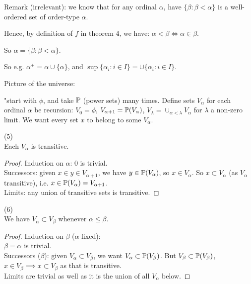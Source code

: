 \documentclass[a4paper]{article}
\begin{document}
Remark (irrelevant): we know that for any ordinal $\alpha$, have $\{\beta:\beta<\alpha\}$ is a well-ordered set of order-type $\alpha$.

Hence, by definition of $f$ in theorem 4, we have: $\alpha<\beta \iff \alpha \in \beta$.

So $\alpha = \{\beta:\beta<\alpha\}$.

So e.g. $\alpha^+ = \alpha \cup \{\alpha\}$, and $\sup\{\alpha_i:i \in I\} = \cup\{\alpha_i:i\in I\}$.

Picture of the universe:

"start with $\phi$, and take $\P$ (power sets) many times. Define sets $V_\alpha$ for each ordinal $\alpha$ be recursion: $V_0 = \phi$, $V_{\alpha+1} = \P(V_\alpha)$, $V_\lambda = \cup_{\alpha < \lambda} V_\alpha$ for $\lambda$ a non-zero limit. We want every set $x$ to belong to some $V_\alpha$.

\begin{lemma} (5)\\
Each $V_\alpha$ is transitive.
\begin{proof}
Induction on $\alpha$: 0 is trivial.\\
Successors: given $x \in y \in V_{\alpha+1}$, we have $y \in \P(V_\alpha)$, so $x \in V_\alpha$. So $x \subset V_\alpha$ (as $V_\alpha$ transitive), i.e. $x \in \P(V_\alpha) = V_{\alpha+1}$.\\
Limits: any union of transitive sets is transitive.
\end{proof}
\end{lemma}

\begin{lemma} (6)\\
We have $V_\alpha \subset V_\beta$ whenever $\alpha \leq \beta$.
\begin{proof}
Induction on $\beta$ ($\alpha$ fixed):\\
$\beta=\alpha$ is trivial.\\
Successors ($\beta$): given $V_\alpha \subset V_\beta$, we want $V_\alpha \subset \P(V_\beta)$. But $V_\beta \subset \P(V_\beta)$, $x \in V_\beta \implies x \subset V_\beta$ as that is transitive.\\
Limits are trivial as well as it is the union of all $V_\alpha$ below.
\end{proof}
\end{lemma}
\end{document}
